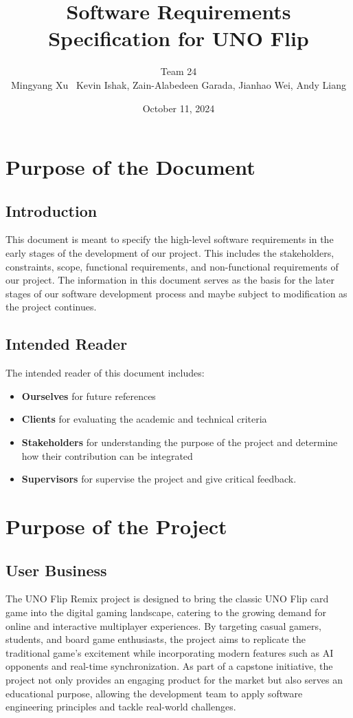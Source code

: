 \documentclass{article}
\title{Software Requirements Specification for UNO Flip}
\author{Team 24 \\ Mingyang Xu \ Kevin Ishak, Zain-Alabedeen Garada, Jianhao Wei, Andy Liang}
\date{October 11, 2024}
\begin{document}
\maketitle

\tableofcontents

\section{Purpose of the Document}

\subsection{Introduction}
This document is meant to specify the high-level software requirements in the early stages of the development of our project. This includes the stakeholders, constraints, scope, functional requirements, and non-functional requirements of our project. The information in this document serves as the basis for the later stages of our software development process and maybe subject to modification as the project continues.

\subsection{Intended Reader}
The intended reader of this document includes:
\begin{itemize}
    \item \textbf{Ourselves} for future references
    \item \textbf{Clients} for evaluating the academic and technical criteria
    \item \textbf{Stakeholders} for understanding the purpose of the project and determine how their contribution can be integrated
    \item \textbf{Supervisors} for supervise the project and give critical feedback.
\end{itemize}

\section{Purpose of the Project}

\subsection{User Business}
The UNO Flip Remix project is designed to bring the classic UNO Flip card game into the digital gaming landscape, catering to the growing demand for online and interactive multiplayer experiences. By targeting casual gamers, students, and board game enthusiasts, the project aims to replicate the traditional game's excitement while incorporating modern features such as AI opponents and real-time synchronization. As part of a capstone initiative, the project not only provides an engaging product for the market but also serves an educational purpose, allowing the development team to apply software engineering principles and tackle real-world challenges.
\end{document}
